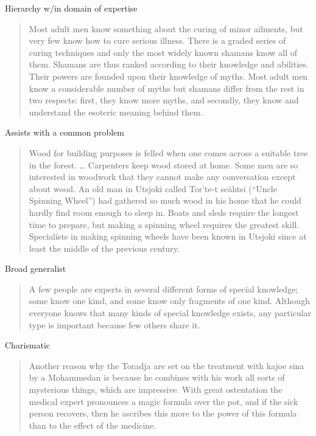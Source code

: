 \documentclass[
]{article}
\begin{document}
Hierarchy w/in domain of expertise

\begin{quote}
Most adult men know something about the curing of minor ailments, but very few know how to cure serious illness. There is a graded series of curing techniques and only the most widely known shamans know all of them. Shamans are thus ranked according to their knowledge and abilities. Their powers are founded upon their knowledge of myths. Most adult men know a considerable number of myths but shamans differ from the rest in two respects: first, they know more myths, and secondly, they know and understand the esoteric meaning behind them.
\end{quote}

Assists with a common problem

\begin{quote}
Wood for building purposes is felled when one comes across a suitable tree in the forest. \ldots{} Carpenters keep wood stored at home. Some men are so interested in woodwork that they cannot make any conversation except about wood. An old man in Utsjoki called Tor'te-t seähtsi (``Uncle Spinning Wheel'') had gathered so much wood in his home that he could hardly find room enough to sleep in. Boats and sleds require the longest time to prepare, but making a spinning wheel requires the greatest skill. Specialists in making spinning wheels have been known in Utsjoki since at least the middle of the previous century.
\end{quote}

Broad generalist

\begin{quote}
A few people are experts in several different forms of special knowledge; some know one kind, and some know only fragments of one kind. Although everyone knows that many kinds of special knowledge exists, any particular type is important because few others share it.
\end{quote}

Charismatic

\begin{quote}
Another reason why the Toradja are set on the treatment with kajoe sina by a Mohammedan is because he combines with his work all sorts of mysterious things, which are impressive. With great ostentation the medical expert pronounces a magic formula over the pot, and if the sick person recovers, then he ascribes this more to the power of this formula than to the effect of the medicine.
\end{quote}
\end{document}
